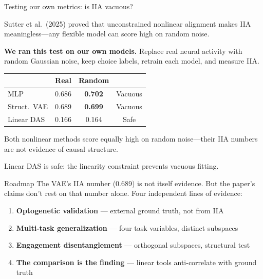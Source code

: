 \documentclass[aspectratio=169,11pt]{beamer}
\begin{document}
\begin{frame}{Testing our own metrics: is IIA vacuous?}

Sutter et al.\ (2025) proved that unconstrained nonlinear alignment makes IIA meaningless---any flexible model can score high on random noise.

\vspace{0.5em}
\textbf{We ran this test on our own models.} Replace real neural activity with random Gaussian noise, keep choice labels, retrain each model, and measure IIA.

\vspace{0.5em}
\centering
{\small
\begin{tabular}{lccc}
\toprule
 & \textbf{Real} & \textbf{Random} & \\
\midrule
MLP & 0.686 & \textcolor{fail}{\textbf{0.702}} & \textcolor{fail}{Vacuous} \\
Struct.\ VAE & 0.689 & \textcolor{fail}{\textbf{0.699}} & \textcolor{fail}{Vacuous} \\
Linear DAS & 0.166 & \textcolor{pass}{0.164} & \textcolor{pass}{Safe} \\
\bottomrule
\end{tabular}
}

\vspace{0.5em}
\begin{flushleft}
Both nonlinear methods score equally high on random noise---their IIA numbers are not evidence of causal structure.

Linear DAS is safe: the linearity constraint prevents vacuous fitting.
\end{flushleft}
\end{frame}

\begin{frame}{Roadmap}
\vspace{0.3em}
The VAE's IIA number (0.689) is not itself evidence. But the paper's claims don't rest on that number alone. Four independent lines of evidence:

\vspace{0.5em}
\begin{enumerate}\setlength\itemsep{0.6em}
  \item \textbf{Optogenetic validation} --- external ground truth, not from IIA
  \item \textbf{Multi-task generalization} --- four task variables, distinct subspaces
  \item \textbf{Engagement disentanglement} --- orthogonal subspaces, structural test
  \item \textbf{The comparison is the finding} --- linear tools anti-correlate with ground truth
\end{enumerate}
\end{frame}
\end{document}
